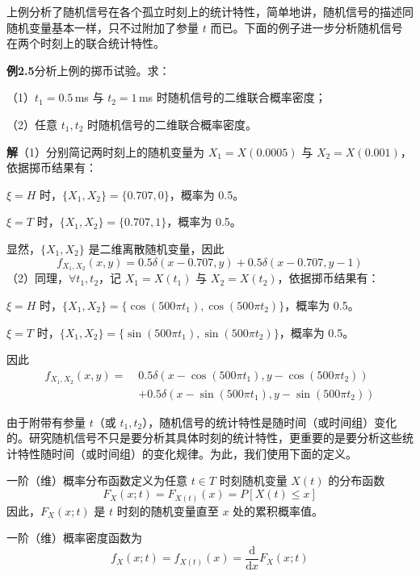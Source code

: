 \documentclass[11pt,openany,UTF8]{ctexbook}
\newcommand{\dif}{\mathrm{d}}                      %
\begin{document}
上例分析了随机信号在各个孤立时刻上的统计特性\nobreak，简单地讲\nobreak，随机信号的描述同随机变量基本一样\nobreak，只不过附加了参量 $t$ 而已\nobreak。下面的例子进一步分析随机信号在两个时刻上的联合统计特性\nobreak。

\begin{examplebox}
\textbf{例2.5}\quad 分析上例的掷币试验\nobreak。求\nobreak：

（1\nobreak）$t_1=0.5$\,ms 与 $t_2=1$\,ms 时随机信号的二维联合概率密度\nobreak；

（2\nobreak）任意 $t_1,t_2$ 时随机信号的二维联合概率密度\nobreak。

\textbf{解}\quad （1\nobreak）分别简记两时刻上的随机变量为 $X_1=X(0.0005)$ 与 $X_2=X(0.001)$\nobreak，依据掷币结果有\nobreak：

$\xi=H$ 时\nobreak，$\{X_1,X_2\}=\{0.707,0\}$\nobreak，概率为 0.5\nobreak。

$\xi=T$ 时\nobreak，$\{X_1,X_2\}=\{0.707,1\}$\nobreak，概率为 0.5\nobreak。

显然\nobreak，$\{X_1,X_2\}$ 是二维离散随机变量\nobreak，因此
\[
  f_{X_1,X_2}(x,y)=0.5\delta(x-0.707,y)+0.5\delta(x-0.707,y-1)
\]
（2\nobreak）同理\nobreak，$\forall t_1,t_2$\nobreak，记 $X_1=X(t_1)$ 与 $X_2=X(t_2)$\nobreak，依据掷币结果有\nobreak：

$\xi=H$ 时\nobreak，$\{X_1,X_2\}=\{\cos(500\pi t_1),\cos(500\pi t_2)\}$\nobreak，概率为 0.5\nobreak。

$\xi=T$ 时\nobreak，$\{X_1,X_2\}=\{\sin(500\pi t_1),\sin(500\pi t_2)\}$\nobreak，概率为 0.5\nobreak。

因此
\[
  \begin{aligned}
    f_{X_1,X_2}(x,y)=\;&0.5\delta(x-\cos(500\pi t_1),y-\cos(500\pi t_2))\\
    &+0.5\delta(x-\sin(500\pi t_1),y-\sin(500\pi t_2))
  \end{aligned}
\]
\end{examplebox}

由于附带有参量 $t$（或 $t_1,t_2$\nobreak）\nobreak，随机信号的统计特性是随时间（或时间组\nobreak）变化的\nobreak。研究随机信号不只是要分析其具体时刻的统计特性\nobreak，更重要的是要分析这些统计特性随时间（或时间组\nobreak）的变化规律\nobreak。为此\nobreak，我们使用下面的定义\nobreak。

一阶（维\nobreak）概率分布函数定义为任意 $t\in T$ 时刻随机变量 $X(t)$ 的分布函数
\[
  F_X(x;t)=F_{X(t)}(x)=P[X(t)\leqslant x]
\]
因此\nobreak，$F_X(x;t)$ 是 $t$ 时刻的随机变量直至 $x$ 处的累积概率值\nobreak。

一阶（维\nobreak）概率密度函数为
\[
  f_X(x;t)=f_{X(t)}(x)=\frac{\dif}{\dif x}F_X(x;t)
\]
\end{document}
